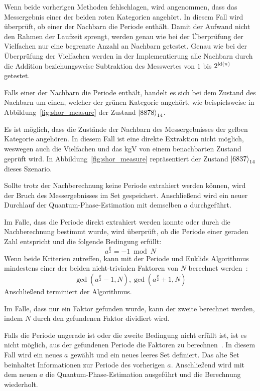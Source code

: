 Wenn beide vorherigen Methoden fehlschlagen, 
wird angenommen, dass das Messergebnis einer der beiden roten Kategorien angehört.
In diesem Fall wird überprüft, ob einer der Nachbarn die Periode enthält.
Damit der Aufwand nicht den Rahmen der Laufzeit sprengt, 
werden genau wie bei der Überprüfung der Vielfachen
nur eine begrenzte Anzahl an Nachbarn getestet.
Genau wie bei der Überprüfung der Vielfachen werden in der Implementierung alle Nachbarn durch 
die Addition beziehungsweise Subtraktion des Messwertes von \(1\) bis \(2^{\operatorname{ld}(n)}\) getestet.

Falls einer der Nachbarn die Periode enthält, 
handelt es sich bei dem Zustand des Nachbarn um einen, 
welcher der grünen Kategorie angehört, 
wie beispielsweise in Abbildung~\ref{fig:shor_measure} der Zustand \(\ket{8878}_{14}\).

Es ist möglich, 
dass die Zustände der Nachbarn des Messergebnisses der gelben Kategorie angehören.
In diesem Fall ist eine direkte Extraktion nicht möglich, 
weswegen auch die Vielfachen und das kgV von einem benachbarten Zustand geprüft wird.
In Abbildung~\ref{fig:shor_measure} repräsentiert der Zustand \(\ket{6837}_{14}\) dieses Szenario.

Sollte trotz der Nachberechnung keine Periode extrahiert werden können, 
wird der Bruch des Messergebnisses im Set gespeichert.
Anschließend wird ein neuer Durchlauf der Quantum-Phase-Estimation 
mit demselben \(a\) durchgeführt.

Im Falle, dass die Periode direkt extrahiert werden konnte oder 
durch die Nachberechnung bestimmt wurde, wird überprüft, 
ob die Periode einer geraden Zahl entspricht und die folgende Bedingung erfüllt:
\[a^{\frac{p}{2}} = -1 \bmod N\]
Wenn beide Kriterien zutreffen, 
kann mit der Periode und 
Euklids Algorithmus mindestens einer der beiden nicht-trivialen Faktoren von \(N\) berechnet werden~\cite{Shor_1997}:
\[\gcd(a^{\frac{p}{2}}-1, N), \gcd(a^{\frac{p}{2}}+1, N)\]
Anschließend terminiert der Algorithmus. 

Im Falle, dass nur ein Faktor gefunden wurde, kann der zweite berechnet werden, 
indem \(N\) durch den gefundenen Faktor dividiert wird.

Falls die Periode ungerade ist oder die zweite Bedingung nicht erfüllt ist, 
ist es nicht möglich, aus der gefundenen Periode die Faktoren zu berechnen~\cite{Shor_1997}.
In diesem Fall wird ein neues \(a\) gewählt und ein neues leeres Set definiert. 
Das alte Set beinhaltet Informationen zur Periode des vorherigen \(a\).
Anschließend wird mit dem neuen \(a\) die Quantum-Phase-Estimation ausgeführt und 
die Berechnung wiederholt.

